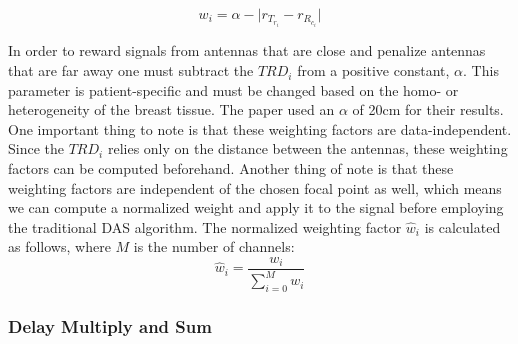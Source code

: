 \begin{equation}
    w_i = \alpha -  \lvert r_{T_{r_i}} - r_{R_{c_i}} \rvert
\end{equation}

In order to reward signals from antennas that are close and penalize antennas that are far away one must subtract the
$TRD_i$ from a positive constant, $\alpha$. This parameter is patient-specific and must be changed based on the homo- or
heterogeneity of the breast tissue. The paper used an $\alpha$ of 20cm for their results. One important thing to note is
that these weighting factors are data-independent. Since the $TRD_i$ relies only on the distance between the antennas,
these weighting factors can be computed beforehand. Another thing of note is that these weighting factors are
independent of the chosen focal point as well, which means we can compute a normalized weight and apply it to the signal
before employing the traditional DAS algorithm. The normalized weighting factor $\hat{w}_i$ is calculated as follows,
where $M$ is the number of channels:
\begin{equation}
    \hat{w}_i = \frac{w_i}{\sum_{i=0}^{M} w_i}
\end{equation} 

\subsubsection{Delay Multiply and Sum}
